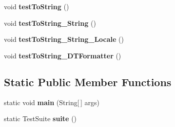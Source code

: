 \begin{DoxyCompactItemize}
\item 
\hypertarget{classorg_1_1joda_1_1time_1_1_test_local_time___basics_acb9c05550a71fc3128ecbdb70deb220d}{void {\bfseries test\-To\-String} ()}\label{classorg_1_1joda_1_1time_1_1_test_local_time___basics_acb9c05550a71fc3128ecbdb70deb220d}

\item 
\hypertarget{classorg_1_1joda_1_1time_1_1_test_local_time___basics_a99045ec24165b5e50ec5e5b06b619b05}{void {\bfseries test\-To\-String\-\_\-\-String} ()}\label{classorg_1_1joda_1_1time_1_1_test_local_time___basics_a99045ec24165b5e50ec5e5b06b619b05}

\item 
\hypertarget{classorg_1_1joda_1_1time_1_1_test_local_time___basics_a0c1251e248a8ca8aa1fdd6a7901a1332}{void {\bfseries test\-To\-String\-\_\-\-String\-\_\-\-Locale} ()}\label{classorg_1_1joda_1_1time_1_1_test_local_time___basics_a0c1251e248a8ca8aa1fdd6a7901a1332}

\item 
\hypertarget{classorg_1_1joda_1_1time_1_1_test_local_time___basics_a6d826b3ff5cb26b3560f5ec572e89a49}{void {\bfseries test\-To\-String\-\_\-\-D\-T\-Formatter} ()}\label{classorg_1_1joda_1_1time_1_1_test_local_time___basics_a6d826b3ff5cb26b3560f5ec572e89a49}

\end{DoxyCompactItemize}
\subsection*{Static Public Member Functions}
\begin{DoxyCompactItemize}
\item 
\hypertarget{classorg_1_1joda_1_1time_1_1_test_local_time___basics_ad7ea6a3cec0dcfa1ca5084ebdbd9ac46}{static void {\bfseries main} (String\mbox{[}$\,$\mbox{]} args)}\label{classorg_1_1joda_1_1time_1_1_test_local_time___basics_ad7ea6a3cec0dcfa1ca5084ebdbd9ac46}

\item 
\hypertarget{classorg_1_1joda_1_1time_1_1_test_local_time___basics_a1b2a6941cdf78b8dc79d963d630b3bfc}{static Test\-Suite {\bfseries suite} ()}\label{classorg_1_1joda_1_1time_1_1_test_local_time___basics_a1b2a6941cdf78b8dc79d963d630b3bfc}

\end{DoxyCompactItemize}
